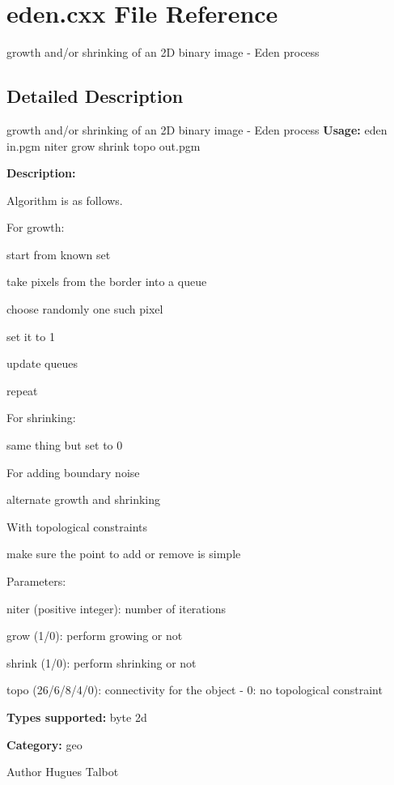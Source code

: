 \section{eden.cxx File Reference}
\label{eden_8cxx}


growth and/or shrinking of an 2D binary image -\/ Eden process  




\subsection{Detailed Description}
growth and/or shrinking of an 2D binary image -\/ Eden process {\bfseries Usage:} eden in.pgm niter grow shrink topo out.pgm

{\bfseries Description:}

Algorithm is as follows.

For growth: \begin{DoxyItemize}
\item start from known set \item take pixels from the border into a queue \item choose randomly one such pixel \item set it to 1 \item update queues \item repeat\end{DoxyItemize}
For shrinking: \begin{DoxyItemize}
\item same thing but set to 0\end{DoxyItemize}
For adding boundary noise \begin{DoxyItemize}
\item alternate growth and shrinking\end{DoxyItemize}
With topological constraints \begin{DoxyItemize}
\item make sure the point to add or remove is simple\end{DoxyItemize}
Parameters: \begin{DoxyItemize}
\item niter (positive integer): number of iterations \item grow (1/0): perform growing or not \item shrink (1/0): perform shrinking or not \item topo (26/6/8/4/0): connectivity for the object -\/ 0: no topological constraint\end{DoxyItemize}
{\bfseries Types supported:} byte 2d

{\bfseries Category:} geo

\begin{DoxyAuthor}{Author}
Hugues Talbot 
\end{DoxyAuthor}
